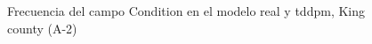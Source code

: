\begin{figure}[H]
    \centering
    
    \caption{Frecuencia del campo Condition en el modelo real y tddpm, King county (A-2)}
    \label{frecuency-tddpm-condition}
\end{figure}